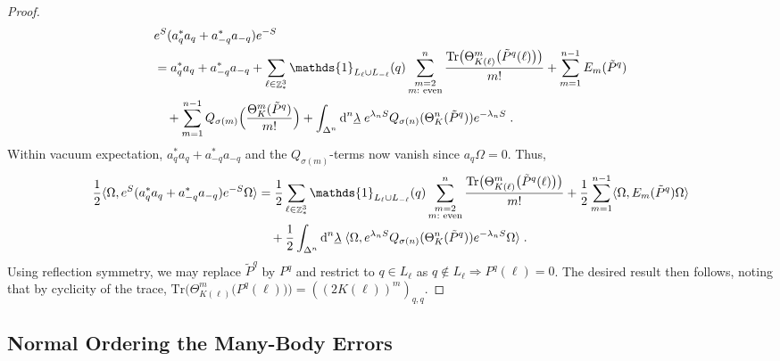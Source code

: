 \documentclass[12pt,a4paper]{article}
\numberwithin{equation}{section}
\newcommand{\1}{\mathbb{I}}
\newcommand{\di}{\textnormal{d}}
\DeclareMathOperator{\Z}{\mathbb{Z}}
\newcommand{\half}{\frac{1}{2}}
\theoremstyle{plain}
\theoremstyle{definition}
\theoremstyle{remark}
\theoremstyle{plain}
\theoremstyle{definition}
\theoremstyle{remark}
\begin{document}
\begin{proof}
\begin{equation}
\begin{aligned}
	&e^{S} (a_q^* a_q + a_{-q}^* a_{-q}) e^{-S} \\
	&= a_q^* a_q + a_{-q}^* a_{-q}
		+ \sum\limits_{\ell\in \Z^3_*} \mathds{1}_{L_\ell \cup L_{-\ell}}(q) \sum\limits_{\substack{m=2\\m:\textnormal{ even}}}^n \frac{\mathrm{Tr} \big(\Theta^m_{K(\ell)} \big( \tilde{P}^q(\ell) \big) \big)}{m!}
		+ \sum\limits_{m=1}^{n-1} E_m(\tilde{P}^q) \\
	&\quad+ \sum\limits_{m=1}^{n-1}
		Q_{\sigma(m)} \Big( \frac{\Theta^m_{K}(\tilde{P}^q)}{m!} \Big)
		+\int_{\Delta^n} \di^n \underline{\lambda} \;
		e^{\lambda_n S}Q_{\sigma(n)}(\Theta^n_K (\tilde{P}^q)) e^{-\lambda_n S} \;.
\end{aligned}
\end{equation}
Within vacuum expectation, $ a_q^* a_q + a_{-q}^* a_{-q} $ and the $ Q_{\sigma(m)} $-terms now vanish since $ a_q \Omega = 0 $. Thus,
\begin{equation}
\begin{aligned}
	\half \langle \Omega, e^{S} (a_q^* a_q + a_{-q}^* a_{-q}) e^{-S} \Omega \rangle
	&= \half \sum\limits_{\ell\in \Z^3_*} \mathds{1}_{L_\ell \cup L_{-\ell}}(q) \sum\limits_{\substack{m=2\\m:\textnormal{ even}}}^n \frac{\mathrm{Tr} \big(\Theta^m_{K(\ell)} \big( \tilde{P}^q(\ell) \big) \big)}{m!}
	+ \half \sum\limits_{m=1}^{n-1} \langle \Omega, E_m(\tilde{P}^q) \Omega \rangle \\
	&\quad + \half \int_{\Delta^n} \di^n \underline{\lambda} \;
		\langle \Omega, e^{\lambda_n S}Q_{\sigma(n)}(\Theta^n_{K}(\tilde{P}^q)) e^{-\lambda_n S} \Omega \rangle \;.
\end{aligned}
\end{equation}
Using reflection symmetry, we may replace $ \tilde{P}^q $ by $ P^q $ and restrict to $ q \in L_\ell $ as $ q \notin L_\ell \Rightarrow P^q(\ell) = 0 $. The desired result then follows, noting that by cyclicity of the trace, $ \mathrm{Tr} \big(\Theta^m_{K(\ell)} \big( P^q(\ell) \big) \big) = ((2K(\ell))^m)_{q,q} $.
\end{proof}






\subsection{Normal Ordering the Many-Body Errors}
\label{sec:extraction_ex}
\end{document}
